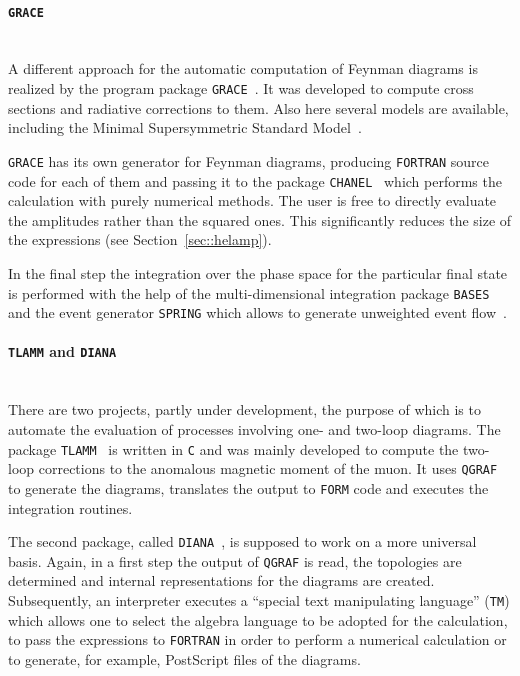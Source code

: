 
\paragraph{{\tt GRACE}}\mbox{}\\[1em]
%
A different approach for the automatic computation of Feynman diagrams
is realized by the program package {\tt GRACE}~\cite{grace}.  It was
developed to compute cross sections and radiative corrections
to them. Also here several models are available, including the
Minimal Supersymmetric Standard Model~\cite{Jim95}.

{\tt GRACE} has its own generator for Feynman diagrams,
producing {\tt FORTRAN} source code for each of them and passing it
to the package {\tt CHANEL}~\cite{CHANEL} which performs the calculation
with purely numerical methods. The user is free to directly evaluate the
amplitudes rather than the squared ones. This significantly reduces
the size of the expressions (see Section~\ref{sec::helamp}).

In the final step the integration over the phase space for the
particular final state is performed with the help of the
multi-dimensional integration package {\tt BASES} and the event
generator {\tt SPRING} which allows to generate unweighted event
flow~\cite{BASES/SPRING}.


\paragraph{{\tt TLAMM} and {\tt DIANA}}\mbox{}\\[1em]
%
There are two projects, partly under development, the purpose of which
is to automate the evaluation of processes involving one- and two-loop
diagrams. The package {\tt TLAMM}~\cite{tlamm} is written in {\tt C} and was
mainly developed to compute the two-loop corrections to the anomalous
magnetic moment of the muon. It uses {\tt QGRAF} to generate the
diagrams, translates the output to {\tt FORM} code and executes the
integration routines.

The second package, called {\tt DIANA}~\cite{diana},
is supposed to work on a more
universal basis. Again, in a first step the output of {\tt QGRAF} is
read, the topologies are determined and internal representations for the
diagrams are created.  Subsequently, an interpreter executes a ``special
text manipulating language'' ({\tt TM}) which allows one to select the
algebra language to be adopted for the calculation, to pass the
expressions to {\tt FORTRAN} in order to perform a numerical calculation
or to generate, for example, PostScript files of the diagrams.

